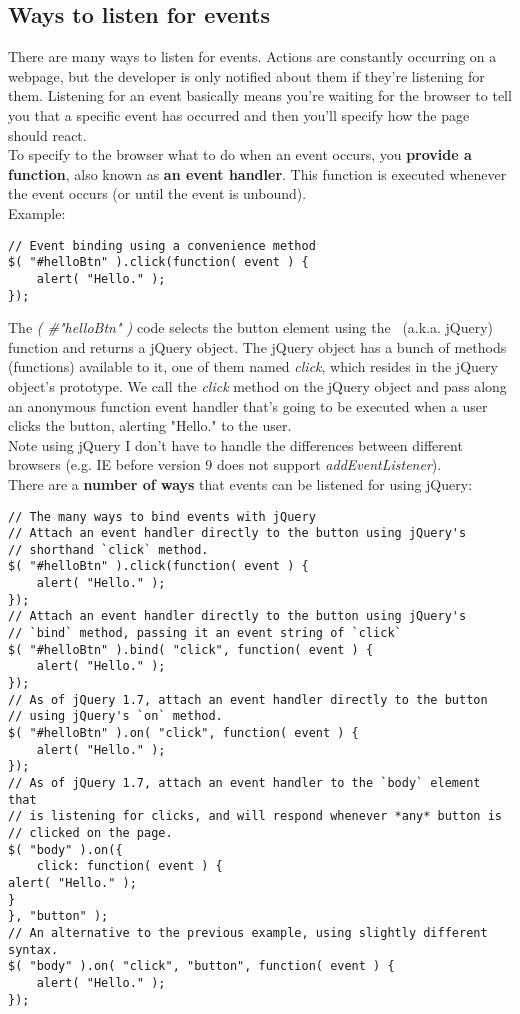 \documentclass[10pt,letterpaper]{report}
\begin{document}
\subsection{Ways to listen for events}
There are many ways to listen for events. Actions are constantly occurring on a webpage, but the developer is only notified about them if they're listening for them. Listening for an event basically means you're waiting for the browser to tell you that a specific event has occurred and then you'll specify how the page should react.\\
To specify to the browser what to do when an event occurs, you \textbf{provide a function}, also known as \textbf{an event handler}. This function is executed whenever the event occurs (or until the event is unbound).\\
Example:
\begin{lstlisting}
// Event binding using a convenience method
$( "#helloBtn" ).click(function( event ) {
	alert( "Hello." );
});
\end{lstlisting}
The \textit{\textdollar ( \#"helloBtn" )} code selects the button element using the \textit{\textdollar}\ (a.k.a. jQuery) function and returns a jQuery object. The jQuery object has a bunch of methods (functions) available to it, one of them named \textit{click}, which resides in the jQuery object's prototype. We call the \textit{click} method on the jQuery object and pass along an anonymous function event handler that's going to be executed when a user clicks the button, alerting "Hello." to the user.\\
Note using jQuery I don't have to handle the differences between different browsers (e.g. IE before version 9 does not support \textit{addEventListener}).\\
There are a \textbf{number of ways} that events can be listened for using jQuery:
\begin{lstlisting}
// The many ways to bind events with jQuery
// Attach an event handler directly to the button using jQuery's
// shorthand `click` method.
$( "#helloBtn" ).click(function( event ) {
	alert( "Hello." );
});
// Attach an event handler directly to the button using jQuery's
// `bind` method, passing it an event string of `click`
$( "#helloBtn" ).bind( "click", function( event ) {
	alert( "Hello." );
});
// As of jQuery 1.7, attach an event handler directly to the button
// using jQuery's `on` method.
$( "#helloBtn" ).on( "click", function( event ) {
	alert( "Hello." );
});
// As of jQuery 1.7, attach an event handler to the `body` element that
// is listening for clicks, and will respond whenever *any* button is
// clicked on the page.
$( "body" ).on({
	click: function( event ) {
alert( "Hello." );
}
}, "button" );
// An alternative to the previous example, using slightly different syntax.
$( "body" ).on( "click", "button", function( event ) {
	alert( "Hello." );
});
\end{lstlisting}
\end{document}
